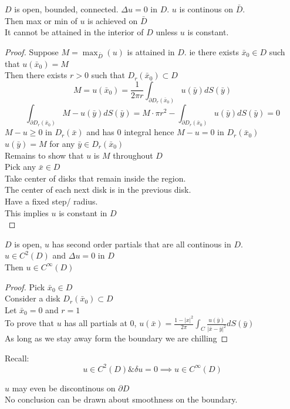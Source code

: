 \documentclass[answers, 12pts,addpoints]{exam}
\begin{document}
\begin{theorem}
    $D$ is open, bounded, connected. $\Delta u = 0$ in $D$. $u$ is continous on $\bar{D}$.\\
    Then max or min of $u$ is achieved on $\bar{D}$\\
    It cannot be attained in the interior of $D$ unless $u$ is constant.\\  
    \begin{proof}
        Suppose $M = \max_{\bar{D}}(u)$ is attained in $D$. ie there exists $\bar{x}_0 \in D$ such that $u(\bar{x}_0) = M$\\
        Then there exists $r > 0$ such that $D_r(\bar{x}_0) \subset D$\\
        $$M = u(\bar{x}_0) = \frac{1}{2\pi r} \int_{\partial D_r(\bar{x}_0)} u(\bar{y}) dS(\bar{y})$$
        $$\int_{\partial D_r(\bar{x}_0)} M - u(\bar{y}) dS(\bar{y}) = M \cdot \pi r^2 -\int_{\partial D_r(\bar{x}_0)} u(\bar{y}) dS(\bar{y}) = 0$$
        $M - u \geq 0 \text{ in } D_r(\bar{x})$ and has $0$ integral hence $M - u = 0$ in $D_r(\bar{x}_0)$\\
        $u(\bar{y}) = M$ for any $\bar{y} \in D_r(\bar{x}_0)$\\
        Remains to show that $u$ is $M$ throughout $D$\\
        Pick any $\bar{x} \in D$\\
        Take center of disks that remain inside the region.\\
        The center of each next disk is in the previous disk.\\
        Have a fixed step/ radius.\\
        This implies $u$ is constant in $D$\\
    \end{proof}
\end{theorem}
\begin{theorem}[Smoothness]
    $D$ is open, $u$ has second order partials that are all continous in $D$.\\
    $u \in C^2(D)$ and $\Delta u = 0$ in $D$\\
    Then $u \in C^\infty(D)$\\
    \begin{proof}
        Pick $\bar{x}_0 \in D$\\
        Consider a disk $D_r(\bar{x}_0) \subset D$\\
        Let $\bar{x}_0 = 0$ and $r = 1$\\
        To prove that $u$ has all partials at $0$, $u(\bar{x}) = \frac{1-|x|^2}{2\pi}\int_C \frac{u(\bar{y})}{|\bar{x} - \bar{y}|^2} dS(\bar{y})$\\
        As long as we stay away form the boundary we are chilling
    \end{proof}
\end{theorem}
Recall: 
$$ u \in C^2(D) \& \delta u = 0 \implies u \in C^\infty(D)$$
\begin{remark}
    $u$ may even be discontinous on $\partial D$\\
    No conclusion can be drawn about smoothness on the boundary.\\
\end{remark}
\end{document}
